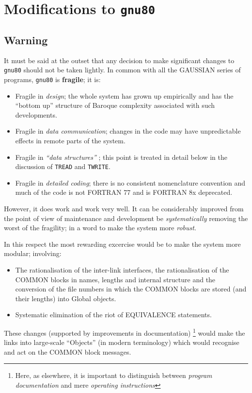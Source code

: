\chapter{\sf Modifications to {\tt gnu80}}
\section{\sf Warning}
It must be said at the outset that any decision to make
significant changes to {\tt gnu80} should not be taken lightly.
In common with all the GAUSSIAN series of programs, {\tt gnu80}
is {\bf fragile}; it  is:
\begin{itemize}
\item Fragile in {\em design}; the whole system has grown up
empirically and has the  ``bottom up'' structure
of Baroque complexity associated with such developments.
\item Fragile in {\em data communication}; changes in the code
may have unpredictable effects in remote parts of the system.
\item Fragile in  {\em ``data structures'' }; this point
is treated in detail below in the discussion of {\tt TREAD} and
{\tt TWRITE}.
\item Fragile in {\em detailed coding}; there is no consistent
nomenclature convention and much of the code is not FORTRAN 77
and is FORTRAN 8x deprecated.
\end{itemize}

However, it does work and work very well. It can be considerably
improved from the point of view of maintenance and development be
{\em systematically} removing the worst of the fragility; in a word
to make the system more {\em robust}.

In this  respect the most rewarding excercise would be to make the
system more modular; involving:
\begin{itemize}
\item The rationalisation of the inter-link interfaces, the
rationalisation of the COMMON blocks in names, lengths and
internal structure and the conversion of the file numbers in which
the COMMON blocks are stored (and their lengths) into Global
objects.
\item Systematic elimination of the riot of EQUIVALENCE statements.
\end{itemize}
These changes (supported by improvements in documentation)
\footnote{
Here, as elsewhere, it is important to distinguish between
{\em program documentation} and mere {\em operating instructions}
}
would make the links into large-scale ``Objects''
(in modern terminology) which would recognise and act on the 
COMMON block messages.

